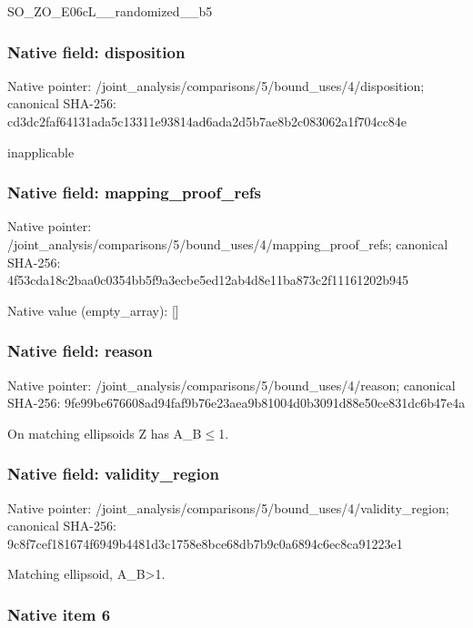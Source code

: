 \documentclass[10pt,a4paper]{article}
\begin{document}
SO\_ZO\_E06cL\_\_randomized\_\_b5


\subsubsection{Native field: disposition}


Native pointer: /joint\_analysis/comparis\allowbreak{}ons/5/bound\_uses/4/dispo\allowbreak{}sition; canonical SHA-256: cd3dc2faf64131ada5c13311\allowbreak{}e93814ad6ada2d5b7ae8b2c0\allowbreak{}83062a1f704cc84e


inapplicable


\subsubsection{Native field: mapping\_proof\_refs}


Native pointer: /joint\_analysis/comparis\allowbreak{}ons/5/bound\_uses/4/mappi\allowbreak{}ng\_proof\_refs; canonical SHA-256: 4f53cda18c2baa0c0354bb5f\allowbreak{}9a3ecbe5ed12ab4d8e11ba87\allowbreak{}3c2f11161202b945



Native value (empty\_array): []



\subsubsection{Native field: reason}


Native pointer: /joint\_analysis/comparis\allowbreak{}ons/5/bound\_uses/4/reaso\allowbreak{}n; canonical SHA-256: 9fe99be676608ad94faf9b76\allowbreak{}e23aea9b81004d0b3091d88e\allowbreak{}50ce831dc6b47e4a


On matching ellipsoids Z has A\_B\ensuremath{\le}1.


\subsubsection{Native field: validity\_region}


Native pointer: /joint\_analysis/comparis\allowbreak{}ons/5/bound\_uses/4/valid\allowbreak{}ity\_region; canonical SHA-256: 9c8f7cef181674f6949b4481\allowbreak{}d3c1758e8bce68db7b9c0a68\allowbreak{}94c6ec8ca91223e1


Matching ellipsoid, A\_B>1.


\subsubsection{Native item 6}
\end{document}
